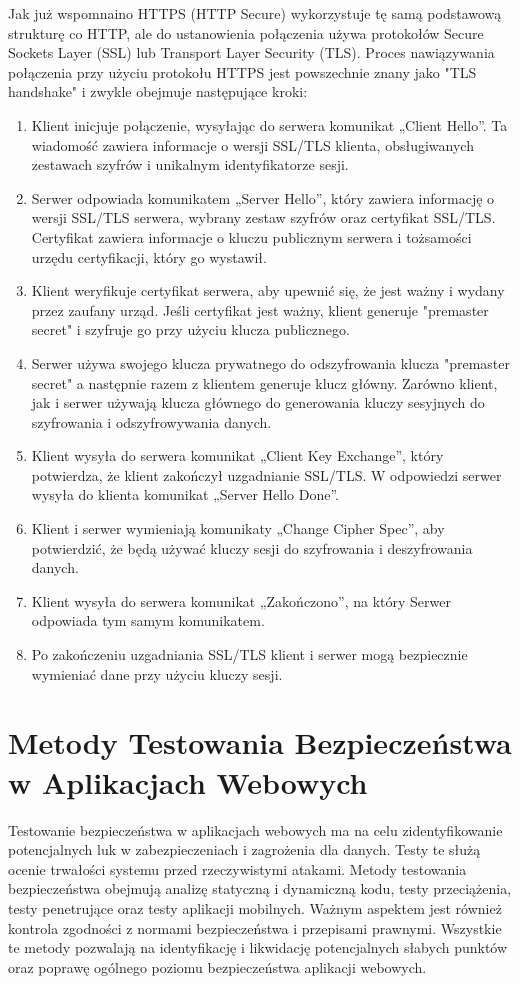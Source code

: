 \documentclass[12pt,twoside]{article}
\begin{document}
Jak już wspomnaino HTTPS (HTTP Secure) wykorzystuje tę samą podstawową strukturę co HTTP, ale do ustanowienia połączenia używa protokołów Secure Sockets Layer (SSL) lub Transport Layer Security (TLS). Proces nawiązywania połączenia przy użyciu protokołu HTTPS jest powszechnie znany jako "TLS handshake" i zwykle obejmuje następujące kroki:
\begin{enumerate}
    \item Klient inicjuje połączenie, wysyłając do serwera komunikat „Client Hello”. Ta wiadomość zawiera informacje o wersji SSL/TLS klienta, obsługiwanych zestawach szyfrów i unikalnym identyfikatorze sesji.
    \item Serwer odpowiada komunikatem „Server Hello”, który zawiera informację o wersji SSL/TLS serwera, wybrany zestaw szyfrów oraz certyfikat SSL/TLS. Certyfikat zawiera informacje o kluczu publicznym serwera i tożsamości urzędu certyfikacji, który go wystawił.
    \item Klient weryfikuje certyfikat serwera, aby upewnić się, że jest ważny i wydany przez zaufany urząd. Jeśli certyfikat jest ważny, klient generuje "premaster secret" i szyfruje go przy użyciu klucza publicznego.
    \item Serwer używa swojego klucza prywatnego do odszyfrowania klucza "premaster secret" a następnie razem z klientem generuje klucz główny. Zarówno klient, jak i serwer używają klucza głównego do generowania kluczy sesyjnych do szyfrowania i odszyfrowywania danych.

    \item Klient wysyła do serwera komunikat „Client Key Exchange”, który potwierdza, że klient zakończył uzgadnianie SSL/TLS. W odpowiedzi serwer wysyła do klienta komunikat „Server Hello Done”.

    \item Klient i serwer wymieniają komunikaty „Change Cipher Spec”, aby potwierdzić, że będą używać kluczy sesji do szyfrowania i deszyfrowania danych.
    \item Klient wysyła do serwera komunikat „Zakończono”, na który Serwer odpowiada tym samym komunikatem.
    \item Po zakończeniu uzgadniania SSL/TLS klient i serwer mogą bezpiecznie wymieniać dane przy użyciu kluczy sesji.
\end{enumerate}
\section{Metody Testowania Bezpieczeństwa w Aplikacjach Webowych}
Testowanie bezpieczeństwa w aplikacjach webowych ma na celu zidentyfikowanie potencjalnych luk w zabezpieczeniach i zagrożenia dla danych.
Testy te służą ocenie trwałości systemu przed rzeczywistymi atakami. Metody testowania bezpieczeństwa obejmują analizę statyczną i dynamiczną kodu, testy przeciążenia, testy penetrujące oraz testy aplikacji mobilnych. Ważnym aspektem jest również kontrola zgodności z normami bezpieczeństwa i przepisami prawnymi. Wszystkie te metody pozwalają na identyfikację i likwidację potencjalnych słabych punktów oraz poprawę ogólnego poziomu bezpieczeństwa aplikacji webowych.
\end{document}
